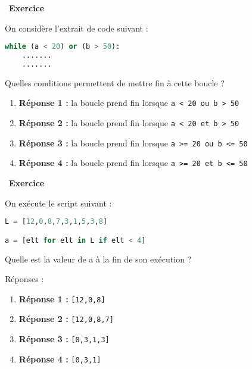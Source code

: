\documentclass[
  11pt,
]{article}
\newcommand{\passthrough}[1]{#1}
\newcounter{exo}
\newenvironment{exercice}[1]
{\par \medskip   \addtocounter{exo}{1} \noindent  
\begin{bclogo}[arrondi =0.1,   noborder = true, logo=\bccrayon, marge=4]{~\textbf{Exercice} \textbf{\theexo} {\itshape #1} }  \par}
{
\end{bclogo}
 \par \bigskip }
\newcounter{def}
\begin{document}
\begin{exercice}{}

On considère l'extrait de code suivant :

\begin{lstlisting}[language=Python]
while (a < 20) or (b > 50):
    .......
    .......
\end{lstlisting}

Quelles conditions permettent de mettre fin à cette boucle ?

\begin{enumerate}
\def\labelenumi{\arabic{enumi}.}
\item
  \textbf{Réponse 1 :} la boucle prend fin lorsque
  \passthrough{\lstinline!a < 20 ou b > 50!}
\item
  \textbf{Réponse 2 :} la boucle prend fin lorsque
  \passthrough{\lstinline!a < 20 et b > 50!}
\item
  \textbf{Réponse 3 :} la boucle prend fin lorsque
  \passthrough{\lstinline!a >= 20 ou b <= 50!}
\item
  \textbf{Réponse 4 :} la boucle prend fin lorsque
  \passthrough{\lstinline!a >= 20 et b <= 50!}
\end{enumerate}

\end{exercice}

\begin{exercice}{}

On exécute le script suivant :

\begin{lstlisting}[language=Python]
L = [12,0,8,7,3,1,5,3,8]

a = [elt for elt in L if elt < 4]
\end{lstlisting}

Quelle est la valeur de a à la fin de son exécution ?

Réponses :

\begin{enumerate}
\def\labelenumi{\arabic{enumi}.}
\item
  \textbf{Réponse 1 :} \passthrough{\lstinline![12,0,8]!}
\item
  \textbf{Réponse 2 :} \passthrough{\lstinline![12,0,8,7]!}
\item
  \textbf{Réponse 3 :} \passthrough{\lstinline![0,3,1,3]!}
\item
  \textbf{Réponse 4 :} \passthrough{\lstinline![0,3,1]!}
\end{enumerate}

\end{exercice}
\end{document}
